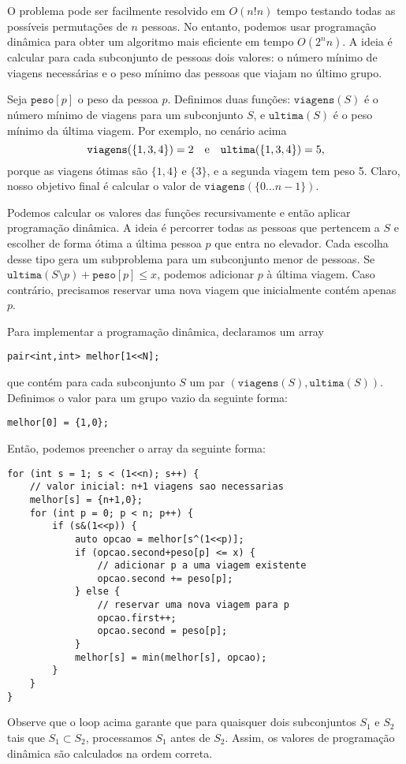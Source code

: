 O problema pode ser facilmente resolvido em $O(n! n)$ tempo
testando todas as possíveis permutações de $n$ pessoas.
No entanto, podemos usar programação dinâmica para obter
um algoritmo mais eficiente em tempo $O(2^n n)$.
A ideia é calcular para cada subconjunto de pessoas
dois valores: o número mínimo de viagens necessárias e
o peso mínimo das pessoas que viajam no último grupo.

Seja $\texttt{peso}[p]$ o peso da
pessoa $p$.
Definimos duas funções:
$\texttt{viagens}(S)$ é o número mínimo de
viagens para um subconjunto $S$,
e $\texttt{ultima}(S)$ é o peso mínimo
da última viagem.
Por exemplo, no cenário acima
\[ \texttt{viagens}(\{1,3,4\})=2 \hspace{10px} \textrm{e}
\hspace{10px} \texttt{ultima}(\{1,3,4\})=5,\]
porque as viagens ótimas são $\{1,4\}$ e $\{3\}$,
e a segunda viagem tem peso 5.
Claro, nosso objetivo final é calcular o valor
de $\texttt{viagens}(\{0 \ldots n-1\})$.

Podemos calcular os valores
das funções recursivamente e então aplicar
programação dinâmica.
A ideia é percorrer todas as pessoas
que pertencem a $S$ e escolher de forma ótima
a última pessoa $p$ que entra no elevador.
Cada escolha desse tipo gera um subproblema
para um subconjunto menor de pessoas.
Se $\texttt{ultima}(S \setminus p)+\texttt{peso}[p] \le x$,
podemos adicionar $p$ à última viagem.
Caso contrário, precisamos reservar uma nova viagem
que inicialmente contém apenas $p$.

Para implementar a programação dinâmica,
declaramos um array
\begin{lstlisting}
pair<int,int> melhor[1<<N];
\end{lstlisting}
que contém para cada subconjunto $S$
um par $(\texttt{viagens}(S),\texttt{ultima}(S))$.
Definimos o valor para um grupo vazio da seguinte forma:
\begin{lstlisting}
melhor[0] = {1,0};
\end{lstlisting}
Então, podemos preencher o array da seguinte forma:

\begin{lstlisting}
for (int s = 1; s < (1<<n); s++) {
    // valor inicial: n+1 viagens sao necessarias
    melhor[s] = {n+1,0};
    for (int p = 0; p < n; p++) {
        if (s&(1<<p)) {
            auto opcao = melhor[s^(1<<p)];
            if (opcao.second+peso[p] <= x) {
                // adicionar p a uma viagem existente
                opcao.second += peso[p];
            } else {
                // reservar uma nova viagem para p
                opcao.first++;
                opcao.second = peso[p];
            }
            melhor[s] = min(melhor[s], opcao);
        }
    }
}
\end{lstlisting}
Observe que o loop acima garante que
para quaisquer dois subconjuntos $S_1$ e $S_2$
tais que $S_1 \subset S_2$, processamos $S_1$ antes de $S_2$.
Assim, os valores de programação dinâmica são calculados na
ordem correta.

